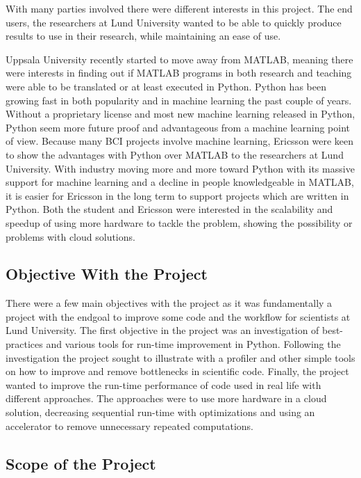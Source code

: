 \documentclass[12pt, a4paper]{article}
\begin{document}
With many parties involved there were different interests in this project.
The end users, the researchers at Lund University wanted to be able to quickly produce results to use in their research, while maintaining an ease of use.

Uppsala University recently started to move away from MATLAB, meaning there were interests in finding out if MATLAB programs in both research and teaching were able to be translated or at least executed in Python.
Python has been growing fast in both popularity and in machine learning the past couple of years.
Without a proprietary license and most new machine learning released in Python, Python seem more future proof and advantageous from a machine learning point of view.
Because many BCI projects involve machine learning, Ericsson were keen to show the advantages with Python over MATLAB to the researchers at Lund University.
With industry moving more and more toward Python with its massive support for machine learning and a decline in people knowledgeable in MATLAB, it is easier for Ericsson in the long term to support projects which are written in Python.
Both the student and Ericsson were interested in the scalability and speedup of using more hardware to tackle the problem, showing the possibility or problems with cloud solutions.

\subsection{Objective With the Project}%

There were a few main objectives with the project as it was fundamentally a project with the endgoal to improve some code and the workflow for scientists at Lund University.
The first objective in the project was an investigation of best-practices and various tools for run-time improvement in Python.
Following the investigation the project sought to illustrate with a profiler and other simple tools on how to improve and remove bottlenecks in scientific code.
Finally, the project wanted to improve the run-time performance of code used in real life with different approaches.
The approaches were to use more hardware in a cloud solution, decreasing sequential run-time with optimizations and using an accelerator to remove unnecessary repeated computations.

\subsection{Scope of the Project}%
\end{document}
